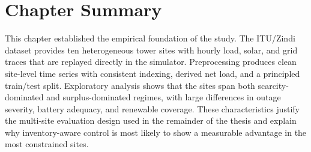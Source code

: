 \section{Chapter Summary}
\label{sec:dataset_summary}

This chapter established the empirical foundation of the study.  The
ITU/Zindi dataset provides ten heterogeneous tower sites with hourly load,
solar, and grid traces that are replayed directly in the simulator.
Preprocessing produces clean site-level time series with consistent indexing,
derived net load, and a principled train/test split.  Exploratory analysis
shows that the sites span both scarcity-dominated and surplus-dominated
regimes, with large differences in outage severity, battery adequacy, and
renewable coverage.  These characteristics justify the multi-site evaluation
design used in the remainder of the thesis and explain why inventory-aware
control is most likely to show a measurable advantage in the most constrained
sites.